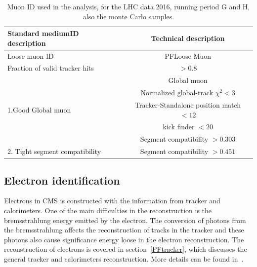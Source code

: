 \begin{table}[!tpb]
\caption{Muon ID used in the analysis, for the LHC data 2016, running period G and H, also the monte Carlo samples.  \label{tbl:standardMedID}}
\label{tab:antil}
\begin{center}
\begin{tabular}{|l|c|}   
\hline
Standard mediumID description                    &  Technical description\\\hline
Loose muon ID                               & PFLoose Muon\\\hline
Fraction of valid tracker hits           & $>0.8$ \\\hline
\multirow{5}{*}{1.Good Global muon}                      &Global muon\\\cline{2-2}
                                                                        &Normalized global-track $\chi^{2}<3$\\\cline{2-2}
                                                                        &Tracker-Standalone position match $< 12$\\\cline{2-2}
                                                                        &kick finder $< 20$ \\\cline{2-2}
                                                                        &Segment compatibility $> 0.303$ \\\hline                                                                       
\hline
2. Tight segment compatibility      & Segment compatibility $>0.451$\\\hline
\end{tabular}
\end{center}
\end{table}


\subsection{Electron identification}

Electrons in CMS is constructed with the information from tracker and calorimeters. One of the main difficulties in the reconstruction is the bremsstrahlung energy emitted by the electron. The conversion of photons from the bremsstrahlung affects the reconstruction of tracks in the tracker and these photons also cause significance energy loose in the electron reconstruction. The reconstruction of electrons is covered in section~\ref{PFtracker}, which discusses the general tracker and calorimeters reconstruction. More details can be found in~\cite{electron_reco2015}. 

